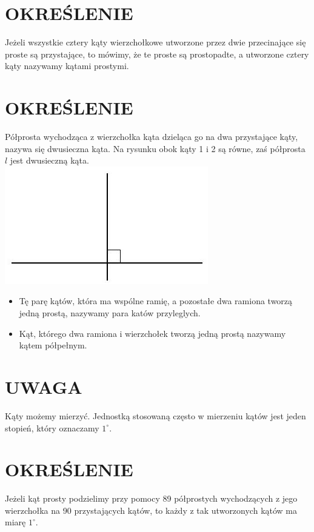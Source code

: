\documentclass[10pt]{article}
\begin{document}
\section*{OKREŚLENIE}
Jeżeli wszystkie cztery kąty wierzchołkowe utworzone przez dwie przecinające się proste są przystające, to mówimy, że te proste są prostopadte, a utworzone cztery kąty nazywamy kątami prostymi.

\section*{OKREŚLENIE}
Półprosta wychodząca z wierzchołka kąta dzieląca go na dwa przystające kąty, nazywa się dwusieczna kąta. Na rysunku obok kąty 1 i 2 są równe, zaś półprosta \(l\) jest dwusieczną kąta.\\
\includegraphics[max width=\textwidth, center]{2024_11_21_8f01584889ff06348ae7g-186(1)}

\begin{itemize}
  \item Tę parę kątów, która ma wspólne ramię, a pozostałe dwa ramiona tworzą jedną prostą, nazywamy para katów przyleglych.
  \item Kąt, którego dwa ramiona i wierzchołek tworzą jedną prostą nazywamy kątem półpełnym.
\end{itemize}

\section*{UWAGA}
Kąty możemy mierzyć. Jednostką stosowaną często w mierzeniu kątów jest jeden stopień, który oznaczamy \(1^{\circ}\).

\section*{OKREŚLENIE}
Jeżeli kąt prosty podzielimy przy pomocy 89 półprostych wychodzących z jego wierzchołka na 90 przystających kątów, to każdy z tak utworzonych kątów ma miarę \(1^{\circ}\).
\end{document}
